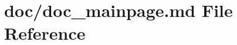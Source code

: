 \hypertarget{doc__mainpage_8md}{}\section{doc/doc\+\_\+mainpage.md File Reference}
\label{doc__mainpage_8md}
